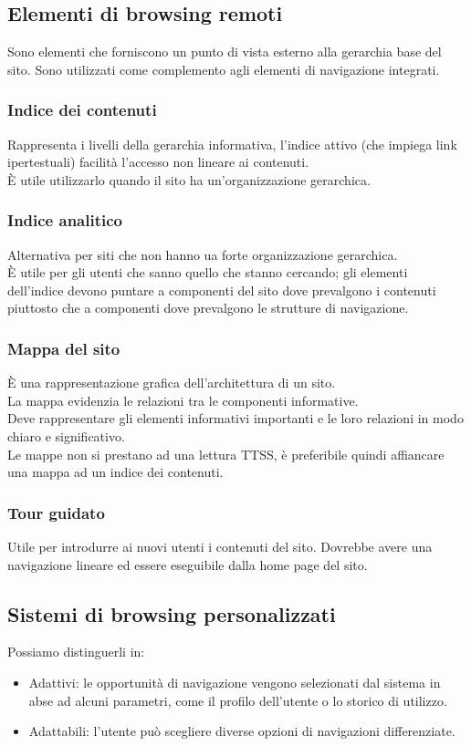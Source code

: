 \documentclass{article}
\begin{document}
\subsection{Elementi di browsing remoti}
Sono elementi che forniscono un punto di vista esterno alla gerarchia base del sito.
Sono utilizzati come complemento agli elementi di navigazione integrati.\\
\subsubsection{Indice dei contenuti}
Rappresenta i livelli della gerarchia informativa, l'indice attivo (che impiega link ipertestuali) facilità l'accesso non lineare ai contenuti.\\
È utile utilizzarlo quando il sito ha un'organizzazione gerarchica.
\subsubsection{Indice analitico}
Alternativa per siti che non hanno ua forte organizzazione gerarchica.\\
È utile per gli utenti che sanno quello che stanno cercando; gli elementi dell'indice devono puntare a componenti del sito dove prevalgono i contenuti piuttosto che a componenti dove prevalgono le strutture di navigazione.
\subsubsection{Mappa del sito}
È una rappresentazione grafica dell'architettura di un sito.\\
La mappa evidenzia le relazioni tra le componenti informative.\\
Deve rappresentare gli elementi informativi importanti e le loro relazioni in modo chiaro e significativo.\\
Le mappe non si prestano ad una lettura TTSS, è preferibile quindi affiancare una mappa ad un indice dei contenuti.
\subsubsection{Tour guidato}
Utile per introdurre ai nuovi utenti i contenuti del sito. Dovrebbe avere una navigazione lineare ed essere eseguibile dalla home page del sito.
\subsection{Sistemi di browsing personalizzati}
Possiamo distinguerli in:
\begin{itemize}
\item Adattivi: le opportunità di navigazione vengono selezionati dal sistema in abse ad alcuni parametri, come il profilo dell'utente o lo storico di utilizzo.
\item Adattabili: l'utente può scegliere diverse opzioni di navigazioni differenziate.
\end{itemize}
\end{document}
